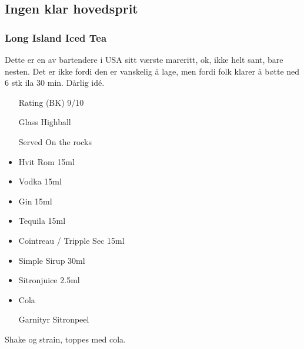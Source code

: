 \subsection{Ingen klar hovedsprit}
\subsubsection{Long Island Iced Tea}
Dette er en av bartendere i USA sitt værste mareritt, ok, ikke helt sant, bare nesten. Det er ikke fordi den er vanskelig å lage, men fordi folk klarer å bøtte ned 6 stk ila 30 min. Dårlig idé.
\begin{itemize}
    \item[Rating (BK)] 9/10
    \item[Glass] Highball
    \item[Served] On the rocks
    \item Hvit Rom 15ml
    \item Vodka 15ml
    \item Gin 15ml
    \item Tequila 15ml
    \item Cointreau / Tripple Sec 15ml
    \item Simple Sirup 30ml
    \item Sitronjuice 2.5ml
    \item Cola
    \item[Garnityr] Sitronpeel
\end{itemize}
Shake og strain, toppes med cola.